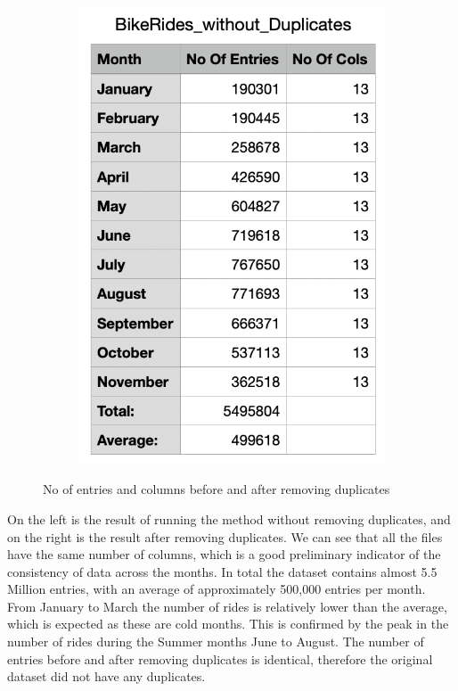 \documentclass[12pt]{article}
\begin{document}
\begin{itemize}
\begin{figure}[h]
\begin{subfigure}{.4\textwidth}
		\includegraphics[scale=0.5]{img3.png}
	\end{subfigure}
	\caption{No of entries and columns before and after removing duplicates}
	\label{fig3}
	\end{figure}
	\pagebreak
	
On the left is the result of running the method without removing duplicates, and on the right is the result after removing duplicates. We can see that all the files have the same number of columns, which is a good preliminary indicator of the consistency of data across the months. In total the dataset contains almost 5.5 Million entries, with an average of approximately 500,000 entries per month. From January to March the number of rides is relatively lower than the average, which is expected as these are cold months. This is confirmed by the peak in the number of rides during the Summer months June to August. The number of entries before and after removing duplicates is identical, therefore the original dataset did not have any duplicates. \\


\end{itemize}
\end{document}

